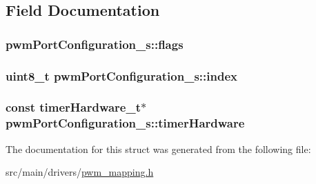 \subsection{Field Documentation}
\hypertarget{structpwmPortConfiguration__s_a85cd3c843dbc8e27d457bed975d43346}{
\subsubsection[{flags}]{ pwm\+Port\+Configuration\+\_\+s\+::flags}}\label{structpwmPortConfiguration__s_a85cd3c843dbc8e27d457bed975d43346}
\hypertarget{structpwmPortConfiguration__s_a71daa6f7e466dddfa89e6368e6c39531}{
\subsubsection[{index}]{\setlength{\rightskip}{0pt plus 5cm}uint8\+\_\+t pwm\+Port\+Configuration\+\_\+s\+::index}}\label{structpwmPortConfiguration__s_a71daa6f7e466dddfa89e6368e6c39531}
\hypertarget{structpwmPortConfiguration__s_a3bc6afc44c3547581f5ac2b4ed6df48f}{
\subsubsection[{timer\+Hardware}]{\setlength{\rightskip}{0pt plus 5cm}const {\bf timer\+Hardware\+\_\+t}$\ast$ pwm\+Port\+Configuration\+\_\+s\+::timer\+Hardware}}\label{structpwmPortConfiguration__s_a3bc6afc44c3547581f5ac2b4ed6df48f}


The documentation for this struct was generated from the following file\+:\begin{DoxyCompactItemize}
\item 
src/main/drivers/\hyperlink{pwm__mapping_8h}{pwm\+\_\+mapping.\+h}\end{DoxyCompactItemize}
